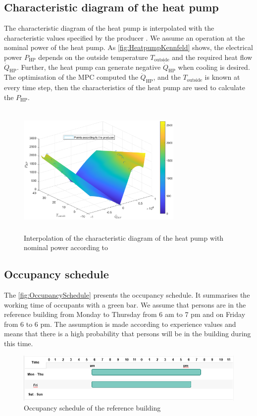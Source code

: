 \subsection{Characteristic diagram of the heat pump}
\label{subsec:charcteristicDiagramHP}
The characteristic diagram of the heat pump is interpolated with the characteristic values specified by the producer \cite{TUM}. We assume an operation at the nominal power of the heat pump. As \autoref{fig:HeatpumpKennfeld} shows, the electrical power $P_\text{HP}$ depends on the outside temperature $T_\text{outside}$ and the required heat flow $\dot{Q}_\text{HP}$. Further, the heat pump can generate negative $\dot{Q}_\text{HP}$ when cooling is desired. The optimisation of the MPC computed the $\dot{Q}_\text{HP}$, and the $T_\text{outside}$ is known at every time step, then the characteristics of the heat pump are used to calculate the $P_\text{HP}$. 
    \begin{figure}[h]
            \centering
            \includegraphics[width=8cm,height=6.5cm]{figure/HeatPumpV55nenn.eps}
           \caption{Interpolation of the characteristic diagram of the heat pump with nominal power according to \cite{TUM}}
           \label{fig:HeatpumpKennfeld}
    \end{figure}
    
\subsection{Occupancy schedule}
\label{subsec:OccupancySchedule}
The \autoref{fig:OccupancySchedule} presents the occupancy schedule. It summarises the working time of occupants with a green bar. We assume that persons are in the reference building from Monday to Thursday from 6 am to 7 pm and on Friday from 6 to 6 pm. The assumption is made according to experience values and means that there is a high probability that persons will be in the building during this time.  
    \begin{figure}[h]
            \centering
            \includegraphics[width=15cm]{figure/Occupancy schedule.PNG}
           \caption{Occupancy schedule of the reference building}
           \label{fig:OccupancySchedule}
    \end{figure}

